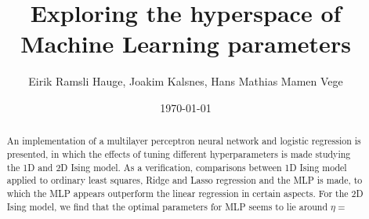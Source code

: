 \documentclass[11pt]{article}
\title{Exploring the hyperspace of Machine Learning parameters}
\author{Eirik Ramsli Hauge, Joakim Kalsnes, Hans Mathias Mamen Vege}
\date{\today}
\begin{document}
\maketitle

\begin{abstract}
An implementation of a multilayer perceptron neural network and logistic regression is presented, in which the effects of tuning different hyperparameters is made studying the 1D and 2D Ising model. As a verification, comparisons between 1D Ising model applied to ordinary least squares, Ridge and Lasso regression and the MLP is made, to which the MLP appears outperform the linear regression in certain aspects. For the 2D Ising model, we find that the optimal parameters for MLP seems to lie around $\eta=$
\end{abstract}


















\end{document}
